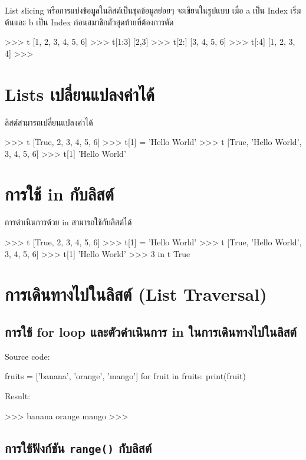List slicing หรือการแบ่งข้อมูลในลิสต์เป็นชุดข้อมูลย่อยๆ จะเขียนในรูปแบบ  \pyinline{[a:b]} เมื่อ a เป็น Index เริ่มต้นและ b เป็น Index ก่อนสมาชิกตัวสุดท้ายที่ต้องการตัด

\begin{pycode}
>>> t
[1, 2, 3, 4, 5, 6]
>>> t[1:3]
[2,3]
>>> t[2:]
[3, 4, 5, 6]
>>> t[:4]
[1, 2, 3, 4]
>>>
\end{pycode}

\section{Lists เปลี่ยนแปลงค่าได้}
ลิสต์สามารถเปลี่ยนแปลงค่าได้ 

\begin{pycode}
>>> t
[True, 2, 3, 4, 5, 6]
>>> t[1] = 'Hello World'
>>> t
[True, 'Hello World', 3, 4, 5, 6]
>>> t[1]
'Hello World'
\end{pycode}


\section{การใช้ in กับลิสต์}

การดำเนินการด้วย in สามารถใช้กับลิสต์ได้ 

\begin{pycode}
>>> t
[True, 2, 3, 4, 5, 6]
>>> t[1] = 'Hello World'
>>> t
[True, 'Hello World', 3, 4, 5, 6]
>>> t[1]
'Hello World'
>>> 3 in t
True
\end{pycode}


\section{การเดินทางไปในลิสต์ (List Traversal)}
\subsection{การใช้ for loop และตัวดำเนินการ in ในการเดินทางไปในลิสต์ }

Source code:
\begin{pycode}
fruits = ['banana', 'orange', 'mango']
for fruit in fruits: print(fruit)
\end{pycode}

Result:
\begin{pycode}
>>>
banana
orange
mango
>>>
\end{pycode}

\subsection{การใช้ฟังก์ชัน  \texttt{range()} กับลิสต์}

